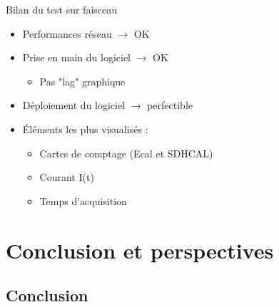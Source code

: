 \documentclass[8pt]{beamer}
\begin{document}
\begin{frame}
\begin{block}{Bilan du test sur faisceau}
\begin{minipage}{0.49\linewidth}
\begin{itemize}
          \item Performances réseau $\rightarrow$ OK
          \item Prise en main du logiciel $\rightarrow$ OK
          \begin{itemize}
            \item Pas "lag" graphique
          \end{itemize}
        \end{itemize}
      \end{minipage} \hfill
      \begin{minipage}{0.49\linewidth}
        \begin{itemize}
          \item Déploiement du logiciel $\rightarrow$ perfectible
          \item Éléments les plus visualisés :
          \begin{itemize}
            \item Cartes de comptage (Ecal et SDHCAL)
            \item Courant I(t)
            \item Temps d'acquisition
          \end{itemize}
        \end{itemize}
      \end{minipage}
    \end{block}
  \end{frame}


  \section{Conclusion et perspectives}

  \begin{frame}
  \frametitle{\secname}
    \tableofcontents[currentsection]
  \end{frame}

  \subsection*{Conclusion}
\end{document}
